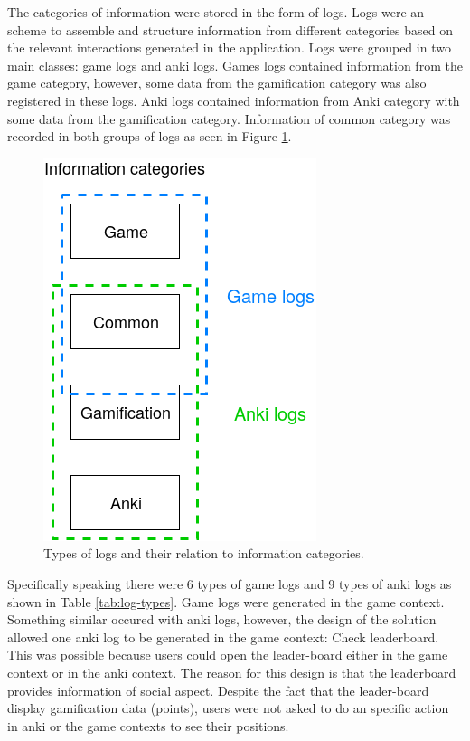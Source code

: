 The categories of information were stored in the form of logs. Logs were an scheme to assemble and structure information from different categories based on the relevant interactions generated in the application. Logs were grouped in two main classes: game logs and anki logs. Games logs contained information from the game category, however, some data from the gamification category was also registered in these logs. Anki logs contained information from Anki category with some data from the gamification category. Information of common category was recorded in both groups of logs as seen in Figure \ref{fig:categories-logs}.

\begin{figure}[htb]
    \vskip 5mm
        \begin{center}
            \includegraphics[scale=0.7]{./Figures/categories_logs.png}
            \caption{Types of logs and their relation to information categories.}
            \label{fig:categories-logs}
        \end{center}
    \vskip -5mm
\end{figure}

Specifically speaking there were 6 types of game logs and 9 types of anki logs as shown in Table \ref{tab:log-types}. Game logs were generated in the game context. Something similar occured with anki logs, however, the design of the solution allowed one anki log to be generated in the game context: Check leaderboard. This was possible because users could open the leader-board either in the game context or in the anki context. The reason for this design is that the leaderboard provides information of social aspect. Despite the fact that the leader-board display gamification data (points), users were not asked to do an specific action in anki or the game contexts to see their positions.

